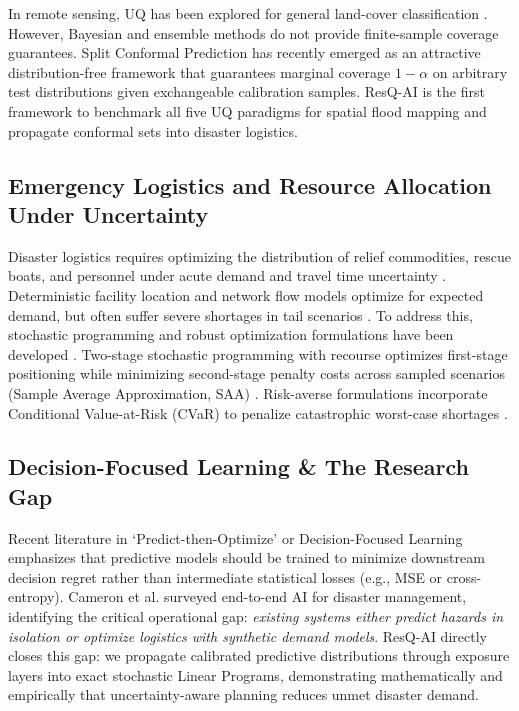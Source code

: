 \documentclass[journal]{IEEEtran}
\begin{document}
In remote sensing, UQ has been explored for general land-cover classification \cite{mena2021, he2020, dusenberry2020, loquercio2020, malinin2019, mukhoti2021}. However, Bayesian and ensemble methods do not provide finite-sample coverage guarantees. Split Conformal Prediction \cite{angelopoulos2021} has recently emerged as an attractive distribution-free framework that guarantees marginal coverage $1-\alpha$ on arbitrary test distributions given exchangeable calibration samples. ResQ-AI is the first framework to benchmark all five UQ paradigms for spatial flood mapping and propagate conformal sets into disaster logistics.

\subsection{Emergency Logistics and Resource Allocation Under Uncertainty}
Disaster logistics requires optimizing the distribution of relief commodities, rescue boats, and personnel under acute demand and travel time uncertainty \cite{sabouhi2019, vahdani2019, mota2020}. Deterministic facility location and network flow models optimize for expected demand, but often suffer severe shortages in tail scenarios \cite{boonmee2021, zhou2020}. To address this, stochastic programming and robust optimization formulations have been developed \cite{altheeb2019, tofighi2020, dufour2021, fereiduni2021, cao2021}. Two-stage stochastic programming with recourse optimizes first-stage positioning while minimizing second-stage penalty costs across sampled scenarios (Sample Average Approximation, SAA) \cite{altheeb2019}. Risk-averse formulations incorporate Conditional Value-at-Risk (CVaR) to penalize catastrophic worst-case shortages \cite{fereiduni2021}.

\subsection{Decision-Focused Learning & The Research Gap}
Recent literature in `Predict-then-Optimize' or Decision-Focused Learning \cite{elmachtoub2022, mandi2020, wilder2019, ferber2020} emphasizes that predictive models should be trained to minimize downstream decision regret rather than intermediate statistical losses (e.g., MSE or cross-entropy). Cameron et al. \cite{cameron2022} surveyed end-to-end AI for disaster management, identifying the critical operational gap: \textit{existing systems either predict hazards in isolation or optimize logistics with synthetic demand models}. ResQ-AI directly closes this gap: we propagate calibrated predictive distributions through exposure layers into exact stochastic Linear Programs, demonstrating mathematically and empirically that uncertainty-aware planning reduces unmet disaster demand.
\end{document}
